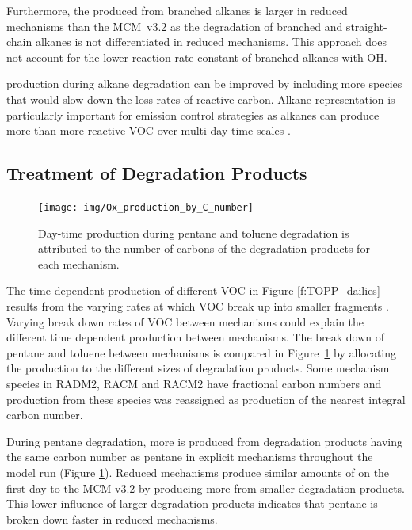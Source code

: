 Furthermore, the  produced from branched alkanes is larger in reduced mechanisms than the \mbox{MCM v3.2} as the degradation of branched and straight-chain alkanes is not differentiated in reduced mechanisms.
This approach does not account for the lower reaction rate constant of branched alkanes with OH.  

 production during alkane degradation can be improved by including more species that would slow down the loss rates of reactive carbon.
Alkane representation is particularly important for emission control strategies as alkanes can produce more  than more-reactive VOC over multi-day time scales \citep{Butler:2011}.

\subsection{Treatment of Degradation Products} \label{ss:products} 

\begin{figure}
    \centering
    \texttt{[image: img/Ox\_production\_by\_C\_number]}
    \vspace{0mm}
    \caption{Day-time  production during pentane and toluene degradation is attributed to the number of carbons of the degradation products for each mechanism.}
    \vspace{-4mm}
    \label{f:carbon}
\end{figure}

The time dependent  production of different VOC in Figure \ref{f:TOPP_dailies} results from the varying rates at which VOC break up into smaller fragments \citep{Butler:2011}.
Varying break down rates of VOC between mechanisms could explain the different time dependent  production between mechanisms.
The break down of pentane and toluene between mechanisms is compared in \mbox{Figure \ref{f:carbon}} by allocating the  production to the different sizes of degradation products.
Some mechanism species in RADM2, RACM and RACM2 have fractional carbon numbers \citep{Stockwell:1990, Stockwell:1997, Goliff:2013} and  production from these species was reassigned as  production of the nearest integral carbon number.  

During pentane degradation, more  is produced from degradation products having the same carbon number as pentane in explicit mechanisms throughout the model run (Figure \ref{f:carbon}).
Reduced mechanisms produce similar amounts of  on the first day to the MCM v3.2 by producing more  from smaller degradation products.
This lower influence of larger degradation products indicates that pentane is broken down faster in reduced mechanisms.


